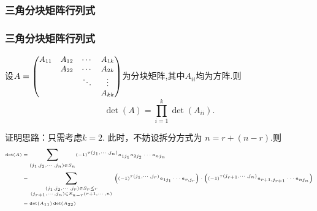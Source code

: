 \subsubsection{三角分块矩阵行列式}
\begin{frame}\frametitle{三角分块矩阵行列式}
\begin{proposition}
设$\small A=
\begin{pmatrix}
A_{11}&A_{12}&\cdots&A_{1k}\\
  &A_{22}&\cdots&A_{2k}\\
  &      &\ddots&\vdots\\
  &      &      &A_{kk}\\
\end{pmatrix}$为分块矩阵,其中$A_{ii}$均为方阵.则
\[\det(A)=\prod_{i=1}^k \det(A_{ii}).\]
\end{proposition}
\pp
{\small
证明思路：只需考虑$k=2$. 此时，不妨设拆分方式为 $n=r+(n-r)$.\pp 则}
\begin{equation*} \tiny
\begin{split}
\det(A) &= \sum_{(j_1,j_2,\cdots,j_n)\in S_n} (-1)^{\tau(j_1,\cdots,j_n)}a_{1j_1}a_{2j_2}\cdots a_{nj_n}\\ 
&=\sum_{(j_1,j_2,\cdots,j_r)\in S_r \leq r \atop(j_{r+1},\cdots,j_n)\in S_{n-r}(r+1,\cdots,n)} \left((-1)^{\tau(j_1,\cdots,j_r)}a_{1j_1}\cdots a_{r,j_r}\right) \cdot \left( (-1)^{\tau(j_{r+1},\cdots,j_n)}a_{r+1,j_{r+1}}\cdots a_{nj_n}\right)\\ 
&=\det(A_{11})\det(A_{22})\\
\end{split}
\end{equation*}
\end{frame}



\renewcommand{\mydate}{2025年03月25号\ 第九次课}

